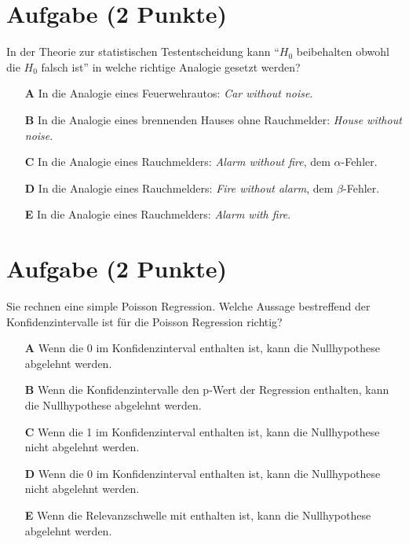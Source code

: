 \documentclass[a4paper, 10pt]{scrartcl}\usepackage[]{graphicx}\usepackage[]{color}
\begin{document}
\section{Aufgabe \hfill (2 Punkte)}



In der Theorie zur statistischen Testentscheidung kann "`$H_0$ beibehalten obwohl die $H_0$ falsch ist"'
in welche richtige Analogie gesetzt werden?



\begin{enumerate}
\item [\textbf{A} \msquare] In die Analogie eines Feuerwehrautos: \textit{Car without noise}.
\item [\textbf{B} \msquare] In die Analogie eines brennenden Hauses ohne Rauchmelder: \textit{House without noise}.
\item [\textbf{C} \msquare] In die Analogie eines Rauchmelders: \textit{Alarm without fire}, dem $\alpha$-Fehler.
\item [\textbf{D} \msquare] In die Analogie eines Rauchmelders: \textit{Fire without alarm}, dem $\beta$-Fehler.
\item [\textbf{E} \msquare] In die Analogie eines Rauchmelders: \textit{Alarm with fire}.
\end{enumerate}

\section{Aufgabe \hfill (2 Punkte)}



Sie rechnen eine simple Poisson Regression. Welche Aussage bestreffend der
Konfidenzintervalle ist f{\"u}r die Poisson Regression richtig?



\begin{enumerate}
\item [\textbf{A} \msquare] Wenn die 0 im Konfidenzinterval enthalten ist, kann die Nullhypothese abgelehnt werden.
\item [\textbf{B} \msquare] Wenn die Konfidenzintervalle den p-Wert der Regression enthalten, kann die Nullhypothese abgelehnt werden.
\item [\textbf{C} \msquare] Wenn die 1 im Konfidenzinterval enthalten ist, kann die Nullhypothese nicht abgelehnt werden.
\item [\textbf{D} \msquare] Wenn die 0 im Konfidenzinterval enthalten ist, kann die Nullhypothese nicht abgelehnt werden.
\item [\textbf{E} \msquare] Wenn die Relevanzschwelle mit enthalten ist, kann die Nullhypothese abgelehnt werden.
\end{enumerate}
\end{document}
